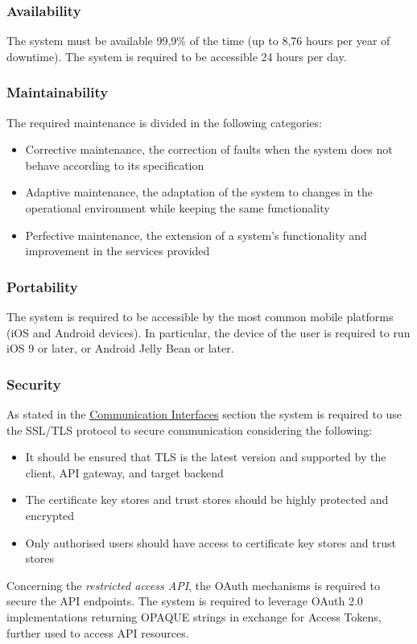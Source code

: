 \subsubsection{Availability}

	The system must be available 99,9\% of the time (up to 8,76 hours per year of downtime). The system is required to be accessible 24 hours per day.
	
\subsubsection{Maintainability}

	The required maintenance is divided in the following categories:
	
	\begin{itemize}
		\item Corrective maintenance, the correction of faults when the system does not behave according to its specification
		\item Adaptive maintenance, the adaptation of the system to changes in the operational environment while keeping the same functionality
		\item Perfective maintenance, the extension of a system's functionality and improvement in the services provided
	\end{itemize}

\subsubsection{Portability}

	The system is required to be accessible by the most common mobile platforms (iOS and Android devices). In particular, the device of the user is required to run iOS 9 or later, or Android Jelly Bean or later.

\subsubsection{Security}

As stated in the \hyperref[sec:ci]{Communication Interfaces} section the system is required to use the SSL/TLS protocol to secure communication considering the following:

	\begin{itemize}
		\item It should be ensured that TLS is the latest version and supported by the client, API gateway, and target backend
		\item The certificate key stores and trust stores should be highly protected and encrypted
		\item Only authorised users should have access to certificate key stores and trust stores
	\end{itemize}

Concerning the \emph{restricted access API}, the OAuth mechanisms is required to secure the API endpoints. The system is required to leverage OAuth 2.0 implementations returning OPAQUE strings in exchange for Access Tokens, further used to access API resources.



\clearpage